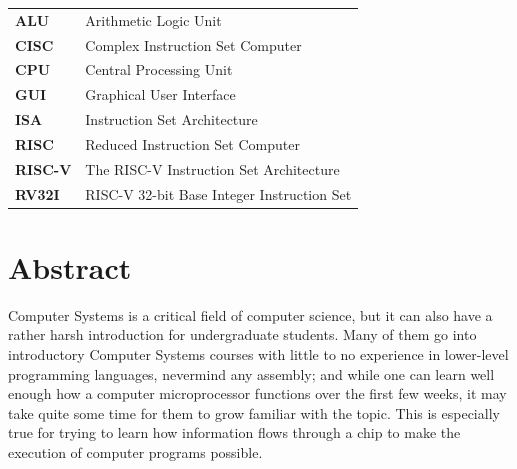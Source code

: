 \documentclass[12pt,twoside]{reedthesis}
\begin{document}
\begin{table}[h]
	\centering %
	\begin{tabular}{ll}
		\textbf{ALU}    & Arithmetic Logic Unit                      \\
		\textbf{CISC}   & Complex Instruction Set Computer           \\
		\textbf{CPU}    & Central Processing Unit                    \\
		\textbf{GUI}    & Graphical User Interface                   \\
		\textbf{ISA}    & Instruction Set Architecture               \\
		\textbf{RISC}   & Reduced Instruction Set Computer           \\
		\textbf{RISC-V} & The RISC-V Instruction Set Architecture    \\
		\textbf{RV32I}  & RISC-V 32-bit Base Integer Instruction Set \\
	\end{tabular}
\end{table}


\tableofcontents
\listoftables
\listoffigures

\chapter*{Abstract}
Computer Systems is a critical field of computer science, but it can also have a rather harsh introduction for undergraduate students. Many of them go into introductory Computer Systems courses with little to no experience in lower-level programming languages, nevermind any assembly; and while one can learn well enough how a computer microprocessor functions over the first few weeks, it may take quite some time for them to grow familiar with the topic. This is especially true for trying to learn how information flows through a chip to make the execution of computer programs possible.
\end{document}
